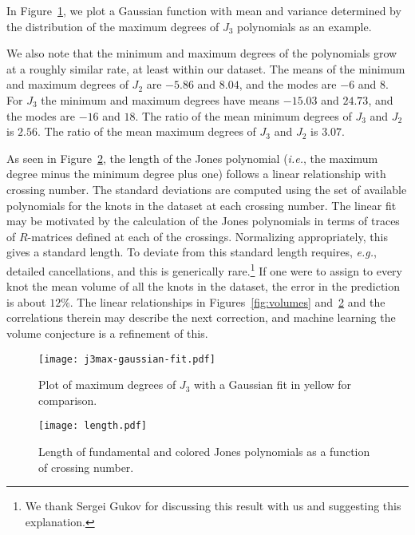 \documentclass[11pt]{article}
\begin{document}
In Figure~\ref{fig:j3max-fit}, we plot a Gaussian function with mean and variance determined by the distribution of the maximum degrees of $J_3$ polynomials as an example.

We also note that the minimum and maximum degrees of the polynomials grow at a roughly similar rate, at least within our dataset.
The means of the minimum and maximum degrees of $J_2$ are $-5.86$ and $8.04$, and the modes are $-6$ and $8$.
For $J_3$ the minimum and maximum degrees have means $-15.03$ and $24.73$, and the modes are $-16$ and $18$.
The ratio of the mean minimum degrees of $J_3$ and $J_2$ is $2.56$.
The ratio of the mean maximum degrees of $J_3$ and $J_2$ is $3.07$.

As seen in Figure~\ref{fig:length}, the length of the Jones polynomial (\textit{i.e.}, the maximum degree minus the minimum degree plus one) follows a linear relationship with crossing number.
The standard deviations are computed using the set of available polynomials for the knots in the dataset at each crossing number.
The linear fit may be motivated by the calculation of the Jones polynomials in terms of traces of $R$-matrices defined at each of the crossings.
Normalizing appropriately, this gives a standard length.
To deviate from this standard length requires, \textit{e.g.}, detailed cancellations, and this is generically rare.\footnote{
We thank Sergei Gukov for discussing this result with us and suggesting this explanation.}
If one were to assign to every knot the mean volume of all the knots in the dataset, the error in the prediction is about $12\%$.
The linear relationships in Figures~\ref{fig:volumes} and~\ref{fig:length} and the correlations therein may describe the next correction, and machine learning the volume conjecture is a refinement of this.




\begin{figure}[h] 
  \begin{center}
    \texttt{[image: j3max-gaussian-fit.pdf]}
  \end{center}
  \caption{\textsf{Plot of maximum degrees of $J_3$ with a Gaussian fit in yellow for comparison.}}  \label{fig:j3max-fit}
\end{figure}

\begin{figure}[h]
\centering
\texttt{[image: length.pdf]}
\caption{\textsf{Length of fundamental and colored Jones polynomials as a function of crossing number.}} 
\label{fig:length}
\end{figure}
\end{document}
